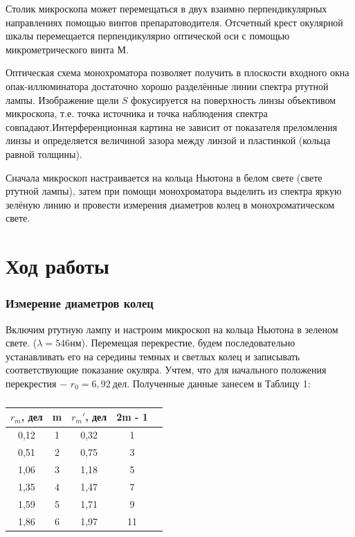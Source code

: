 \documentclass[a4paper,12pt]{article}
\begin{document}
	Столик микроскопа может перемещаться в двух взаимно перпендикулярных направлениях помощью винтов препаратоводителя. Отсчетный крест окулярной шкалы перемещается перпендикулярно оптической оси с помощью микрометрического винта $ М $.
	
	Оптическая схема монохроматора позволяет получить в плоскости входного окна опак-иллюминатора достаточно хорошо разделённые линии спектра ртутной лампы. Изображение щели $ S $ фокусируется на поверхность линзы объективом микроскопа, т.е. точка источника и точка наблюдения спектра совпадают.Интерференционная картина не зависит от показателя преломления линзы и определяется величиной зазора между линзой и пластинкой (кольца равной толщины).

	Сначала микроскоп настраивается на кольца Ньютона в белом свете (свете ртутной лампы), затем при помощи монохроматора выделить из спектра яркую зелёную линию и провести измерения диаметров колец в монохроматическом свете. 


\newpage

\section*{Ход работы}
\subsubsection*{Измерение диаметров колец}
Включим ртутную лампу и настроим микроскоп на кольца Ньютона в зеленом свете. ($\lambda = 546 нм$). Перемещая перекрестие, будем последовательно устанавливать его на середины темных и светлых колец и записывать соответствующие показание окуляра. Учтем, что для начального положения перекрестия $-$ $r_0 = 6,92 \ дел $. Полученные данные занесем в Таблицу 1:

\begin{table}[h]
\begin{center}
\caption{}
\begin{tabular}{|c|c|c|c|c|}
\hline
 $r_m$, дел & m & $r_m'$, дел & 2m - 1 \\ \hline 
 0,12      & 1 & 0,32       & 1      \\ \hline
 0,51      & 2 & 0,75       & 3      \\ \hline
 1,06      & 3 & 1,18       & 5      \\ \hline
 1,35      & 4 & 1,47       & 7      \\ \hline
 1,59      & 5 & 1,71       & 9      \\ \hline
 1,86      & 6 & 1,97       & 11     \\ \hline
\end{tabular}
\end{center}
\end{table} 
\end{document}
